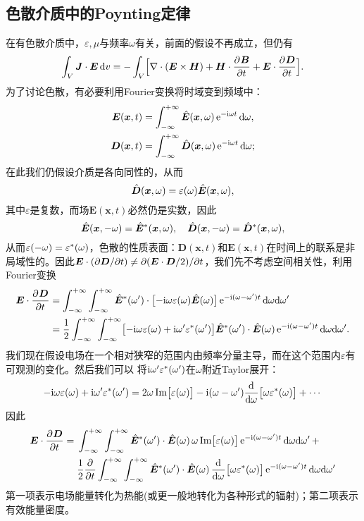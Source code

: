 \subsection{色散介质中的Poynting定律}
\label{ssec:Poynting in dissipative media}
在有色散介质中，$\varepsilon,\mu$与频率$\omega$有关，前面的假设不再成立，但仍有
\[
    \int_V\bm J\cdot\bm E\mathop{}\!\mathrm{d} v=-\int_V\Bigl[\nabla\cdot(\bm E\times\bm H)+\bm H\cdot\frac{\partial^{{}}\bm B}{\partial{t}^{{}}}+\bm E\cdot\frac{\partial^{{}}\bm D}{\partial{t}^{{}}}\Bigr].
\]
为了讨论色散，有必要利用Fourier变换将时域变到频域中：
\begin{align*}
    \bm E(\bm x,t)&=\int_{-\infty}^{+\infty}\hat{\bm{E}}(\bm x,\omega)\mathop{}\!\mathrm{e}^{-\mathrm{i}\omega t}\mathop{}\!\mathrm{d}\omega,\\
    \bm D(\bm x,t)&=\int_{-\infty}^{+\infty}\hat{\bm{D}}(\bm x,\omega)\mathop{}\!\mathrm{e}^{-\mathrm{i}\omega t}\mathop{}\!\mathrm{d}\omega;
\end{align*}
在此我们仍假设介质是各向同性的，从而
\[
    \hat{\bm{D}}(\bm x,\omega)=\varepsilon(\omega)\hat{\bm{E}}(\bm x,\omega),
\]
其中$\varepsilon$是复数，而场$\bm E(\bm x,t)$必然仍是实数，因此%
\[
    \hat{\bm{E}}(\bm x,-\omega)=\hat{\bm{E}}^\ast(\bm x,\omega),\quad\hat{\bm{D}}(\bm x,-\omega)=\hat{\bm{D}}^\ast(\bm x,\omega),
\]
从而$\varepsilon(-\omega)=\varepsilon^\ast(\omega)$，色散的性质表面：$\bm D(\bm x,t)$和$\bm E(\bm x,t)$在时间上的联系是非局域性的。因此$\bm E\cdot(\partial\bm D/\partial t)\neq\partial(\bm E\cdot\bm D/2)/\partial t$，我们先不考虑空间相关性，利用Fourier变换
\begin{align*}
    \bm E\cdot\frac{\partial^{{}}\bm D}{\partial{t}^{{}}}&=\int_{-\infty}^{+\infty}\int_{-\infty}^{+\infty}\hat{\bm{E}}^\ast(\omega')\cdot\bigl[-\mathrm{i}\omega\varepsilon(\omega)\hat{\bm{E}}(\omega)\bigr]\mathop{}\!\mathrm{e}^{-\mathrm{i}(\omega-\omega')t}\mathop{}\!\mathrm{d}\omega\mathrm{d}\omega'\\
    &=\frac12\int_{-\infty}^{+\infty}\int_{-\infty}^{+\infty}\bigl[-\mathrm{i}\omega\varepsilon(\omega)+\mathrm{i}\omega'\varepsilon^\ast(\omega')\bigr]\hat{\bm{E}}^\ast(\omega')\cdot\hat{\bm{E}}(\omega)\mathop{}\!\mathrm{e}^{-\mathrm{i}(\omega-\omega')t}\mathop{}\!\mathrm{d}\omega\mathrm{d}\omega'.
\end{align*}
我们现在假设电场在一个相对狭窄的范围内由频率分量主导，而在这个范围内$\varepsilon$有可观测的变化。然后我们可以%
将$\mathrm{i}\omega'\varepsilon^\ast(\omega')$在$\omega$附近Taylor展开：
\[
    -\mathrm{i}\omega\varepsilon(\omega)+\mathrm{i}\omega'\varepsilon^\ast(\omega')=2\omega\operatorname{Im}\bigl[\varepsilon(\omega)\bigr]-\mathrm{i}(\omega-\omega')\frac{\mathrm{d}^{{}}}{\mathrm{d}{\omega}^{{}}}\bigl[\omega\varepsilon^\ast(\omega)\bigr]+\cdots
\]
因此 
\begin{align*}
    \bm E\cdot\frac{\partial^{{}}\bm D}{\partial{t}^{{}}}={}&\int_{-\infty}^{+\infty}\int_{-\infty}^{+\infty}\hat{\bm{E}}^\ast(\omega')\cdot\hat{\bm{E}}(\omega)\,\omega\operatorname{Im}\bigl[\varepsilon(\omega)\bigr]\mathop{}\!\mathrm{e}^{-\mathrm{i}(\omega-\omega')t}\mathop{}\!\mathrm{d}\omega\mathrm{d}\omega'\,+\\
    &\frac12\frac{\partial^{{}}}{\partial{t}^{{}}}\int_{-\infty}^{+\infty}\int_{-\infty}^{+\infty}\hat{\bm{E}}^\ast(\omega')\cdot\hat{\bm{E}}(\omega)\,\frac{\mathrm{d}^{{}}}{\mathrm{d}{\omega}^{{}}}\bigl[\omega\varepsilon^\ast(\omega)\bigr]\mathop{}\!\mathrm{e}^{-\mathrm{i}(\omega-\omega')t}\mathop{}\!\mathrm{d}\omega\mathrm{d}\omega'
\end{align*}
第一项表示电场能量转化为热能(或更一般地转化为各种形式的辐射)；第二项表示有效能量密度。

